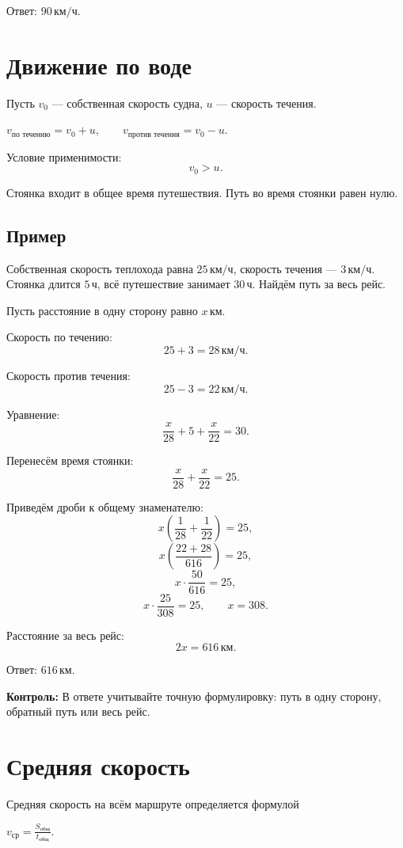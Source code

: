 \documentclass[a4paper,12pt]{article}
\newcommand{\unit}[1]{\,\text{#1}}
\newcommand{\formula}[1]{%
  \begin{center}
    \large\color{darkaccent}\ensuremath{#1}
  \end{center}
}
\newcommand{\checkpoint}[1]{%
  \par\smallskip
  {\color{warn}\textbf{Контроль:} #1}\par\smallskip
}
\begin{document}
Ответ: $90\unit{км/ч}$.

\section{Движение по воде}

Пусть $v_0$ --- собственная скорость судна,
$u$ --- скорость течения.

\formula{
  v_{\text{по течению}}=v_0+u,
  \qquad
  v_{\text{против течения}}=v_0-u.
}

Условие применимости:
\[
v_0>u.
\]

Стоянка входит в общее время путешествия.
Путь во время стоянки равен нулю.

\subsection{Пример}

Собственная скорость теплохода равна $25\unit{км/ч}$,
скорость течения --- $3\unit{км/ч}$.
Стоянка длится $5\unit{ч}$,
всё путешествие занимает $30\unit{ч}$.
Найдём путь за весь рейс.

Пусть расстояние в одну сторону равно $x\unit{км}$.

Скорость по течению:
\[
25+3=28\unit{км/ч}.
\]

Скорость против течения:
\[
25-3=22\unit{км/ч}.
\]

Уравнение:
\[
\frac{x}{28}
+
5
+
\frac{x}{22}
=
30.
\]

Перенесём время стоянки:
\[
\frac{x}{28}
+
\frac{x}{22}
=
25.
\]

Приведём дроби к общему знаменателю:
\[
x\left(
\frac{1}{28}
+
\frac{1}{22}
\right)
=
25,
\]
\[
x\left(
\frac{22+28}{616}
\right)
=
25,
\]
\[
x\cdot\frac{50}{616}
=
25,
\]
\[
x\cdot\frac{25}{308}
=
25,
\qquad
x=308.
\]

Расстояние за весь рейс:
\[
2x=616\unit{км}.
\]

Ответ: $616\unit{км}$.

\checkpoint{
  В ответе учитывайте точную формулировку:
  путь в одну сторону, обратный путь или весь рейс.
}

\section{Средняя скорость}

Средняя скорость на всём маршруте определяется формулой
\formula{
  v_{\text{ср}}
  =
  \frac{S_{\text{общ}}}{t_{\text{общ}}}.
}
\end{document}
